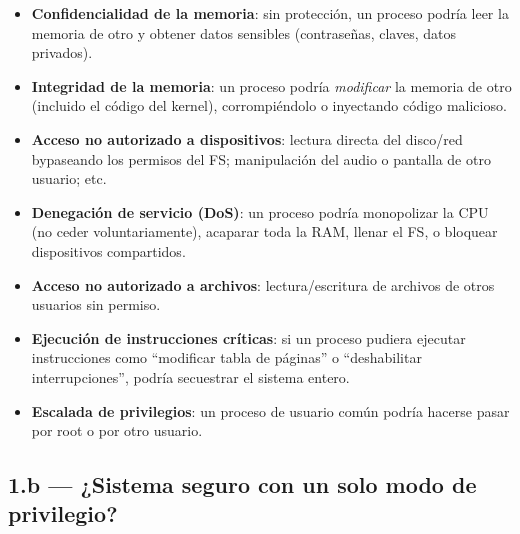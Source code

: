 \documentclass[11pt,a4paper]{article}
\begin{document}
\begin{itemize}[leftmargin=*]
    \item \textbf{Confidencialidad de la memoria}: sin protección,
        un proceso podría leer la memoria de otro y obtener datos
        sensibles (contraseñas, claves, datos privados).
    \item \textbf{Integridad de la memoria}: un proceso podría
        \emph{modificar} la memoria de otro (incluido el código del
        kernel), corrompiéndolo o inyectando código malicioso.
    \item \textbf{Acceso no autorizado a dispositivos}: lectura
        directa del disco/red bypaseando los permisos del FS;
        manipulación del audio o pantalla de otro usuario; etc.
    \item \textbf{Denegación de servicio (DoS)}: un proceso podría
        monopolizar la CPU (no ceder voluntariamente), acaparar toda
        la RAM, llenar el FS, o bloquear dispositivos compartidos.
    \item \textbf{Acceso no autorizado a archivos}: lectura/escritura
        de archivos de otros usuarios sin permiso.
    \item \textbf{Ejecución de instrucciones críticas}: si un proceso
        pudiera ejecutar instrucciones como ``modificar tabla de
        páginas'' o ``deshabilitar interrupciones'', podría
        secuestrar el sistema entero.
    \item \textbf{Escalada de privilegios}: un proceso de usuario
        común podría hacerse pasar por root o por otro usuario.
\end{itemize}

\subsection*{1.b --- ¿Sistema seguro con un solo modo de privilegio?}
\end{document}
